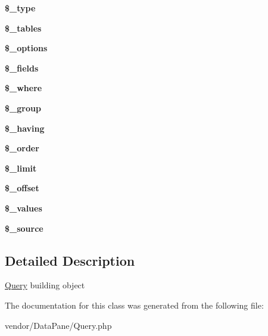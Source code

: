 \begin{DoxyCompactItemize}
\item 
\hypertarget{classQuery_af9516b773518c760c073a94acd6f9f58}{
{\bfseries \$\_\-type}}
\label{classQuery_af9516b773518c760c073a94acd6f9f58}

\item 
\hypertarget{classQuery_a0c5a7fcf4f5ed9b270c3932452db2e16}{
{\bfseries \$\_\-tables}}
\label{classQuery_a0c5a7fcf4f5ed9b270c3932452db2e16}

\item 
\hypertarget{classQuery_a7c05093484cbe6930bb04114836022dd}{
{\bfseries \$\_\-options}}
\label{classQuery_a7c05093484cbe6930bb04114836022dd}

\item 
\hypertarget{classQuery_a93578711b18d6ef73b21b59139f7e1cb}{
{\bfseries \$\_\-fields}}
\label{classQuery_a93578711b18d6ef73b21b59139f7e1cb}

\item 
\hypertarget{classQuery_ab396928f9de8fd3096f0ada7003448aa}{
{\bfseries \$\_\-where}}
\label{classQuery_ab396928f9de8fd3096f0ada7003448aa}

\item 
\hypertarget{classQuery_a28cf8b5002c8e8d1e67b914ac1babb6d}{
{\bfseries \$\_\-group}}
\label{classQuery_a28cf8b5002c8e8d1e67b914ac1babb6d}

\item 
\hypertarget{classQuery_a44e4ddf3d5b4b01823d6b2efab32e791}{
{\bfseries \$\_\-having}}
\label{classQuery_a44e4ddf3d5b4b01823d6b2efab32e791}

\item 
\hypertarget{classQuery_aafe1b8e93a3c2d9cf33d593a5658a57b}{
{\bfseries \$\_\-order}}
\label{classQuery_aafe1b8e93a3c2d9cf33d593a5658a57b}

\item 
\hypertarget{classQuery_a609b3b32d47fcf4d568efb5346de4bbb}{
{\bfseries \$\_\-limit}}
\label{classQuery_a609b3b32d47fcf4d568efb5346de4bbb}

\item 
\hypertarget{classQuery_a5afa3c962cd75c0e424011a8dbc88240}{
{\bfseries \$\_\-offset}}
\label{classQuery_a5afa3c962cd75c0e424011a8dbc88240}

\item 
\hypertarget{classQuery_aa28c6fd0c63035538bc5a68668e3398d}{
{\bfseries \$\_\-values}}
\label{classQuery_aa28c6fd0c63035538bc5a68668e3398d}

\item 
\hypertarget{classQuery_a34686fd14bc5f7c98a53c4c956fb224c}{
{\bfseries \$\_\-source}}
\label{classQuery_a34686fd14bc5f7c98a53c4c956fb224c}

\end{DoxyCompactItemize}


\subsection{Detailed Description}
\hyperlink{classQuery}{Query} building object 

The documentation for this class was generated from the following file:\begin{DoxyCompactItemize}
\item 
vendor/DataPane/Query.php\end{DoxyCompactItemize}
